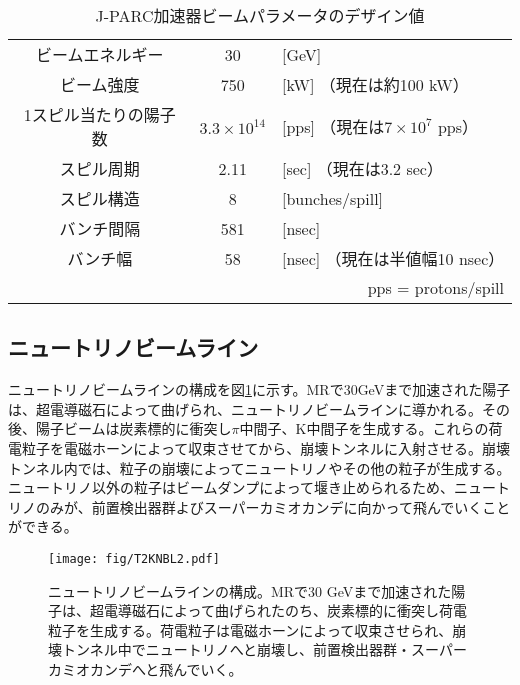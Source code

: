 \documentclass[11pt]{jreport}
\newcommand{\figref}[1]{図\ref{#1}}
\begin{document}
\begin{table}[htbp]
\caption[J-PARC加速器ビームパラメータのデザイン値]{J-PARC加速器ビームパラメータのデザイン値}
\begin{center}
\begin{tabular}{ccl}
\hline \hline
ビームエネルギー & 30 & [GeV]\\
ビーム強度 & 750 &[kW] （現在は約100 kW）\\
1スピル当たりの陽子数 & $3.3 \times 10^{14}$ & [pps] （現在は$7\times10^{7}$ pps）\\
スピル周期 & 2.11 & [sec] （現在は3.2 sec）\\
スピル構造 & 8 &[bunches/spill]\\
バンチ間隔 & 581 & [nsec]\\
バンチ幅 & 58 & [nsec] （現在は半値幅10 nsec）\\
\hline \hline
\multicolumn{3}{r}{pps = protons/spill}\\
\end{tabular}
\end{center}
\label{JPARCBeamlineSpec}
\end{table}%

\newpage
\subsection{ニュートリノビームライン}
ニュートリノビームラインの構成を\figref{T2KNeutrinoBeamline}に示す。MRで30GeVまで加速された陽子は、超電導磁石によって曲げられ、ニュートリノビームラインに導かれる。その後、陽子ビームは炭素標的に衝突し$\pi$中間子、K中間子を生成する。これらの荷電粒子を電磁ホーンによって収束させてから、崩壊トンネルに入射させる。崩壊トンネル内では、粒子の崩壊によってニュートリノやその他の粒子が生成する。ニュートリノ以外の粒子はビームダンプによって堰き止められるため、ニュートリノのみが、前置検出器群よびスーパーカミオカンデに向かって飛んでいくことができる。

\begin{figure}[htbp]
\centering
\texttt{[image: fig/T2KNBL2.pdf]}
\caption[ニュートリノビームラインの構成]{ニュートリノビームラインの構成。MRで30 GeVまで加速された陽子は、超電導磁石によって曲げられたのち、炭素標的に衝突し荷電粒子を生成する。荷電粒子は電磁ホーンによって収束させられ、崩壊トンネル中でニュートリノへと崩壊し、前置検出器群・スーパーカミオカンデへと飛んでいく。}
\label{T2KNeutrinoBeamline}
\end{figure}

\end{document}
